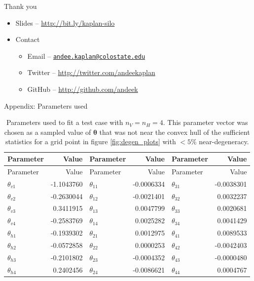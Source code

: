 \documentclass[ignorenonframetext,]{beamer}
\providecommand{\tightlist}{%
  \setlength{\itemsep}{0pt}\setlength{\parskip}{0pt}}
\theoremstyle{definition}
\newcommand{\nv}{{n_{\scriptscriptstyle V}}}
\newcommand{\nh}{{n_{\scriptscriptstyle H}}}
\begin{document}
\begin{frame}{Thank you}
\protect\hypertarget{thank-you}{}

\begin{itemize}
\item
  Slides -- \url{http://bit.ly/kaplan-silo}
\item
  Contact

  \begin{itemize}
  \tightlist
  \item
    Email --
    \href{mailto:andee.kaplan@colostate.edu}{\nolinkurl{andee.kaplan@colostate.edu}}
  \item
    Twitter -- \url{http://twitter.com/andeekaplan}
  \item
    GitHub -- \url{http://github.com/andeek}
  \end{itemize}
\end{itemize}

\end{frame}

\begin{frame}{Appendix: Parameters used}
\protect\hypertarget{appendix-parameters-used}{}

\scriptsize

\begin{longtable}[]{@{}lrlrlr@{}}
\caption{\label{tab:theta}Parameters used to fit a test case with
\(\nv = \nh = 4\). This parameter vector was chosen as a sampled value
of \(\boldsymbol \theta\) that was not near the convex hull of the
sufficient statistics for a grid point in figure \ref{fig:degen_plots}
with \(< 5\)\% near-degeneracy.}\tabularnewline
\toprule
Parameter & Value & Parameter & Value & Parameter & Value\tabularnewline
\midrule
\endfirsthead
\toprule
Parameter & Value & Parameter & Value & Parameter & Value\tabularnewline
\midrule
\endhead
\(\theta_{v1}\) & -1.1043760 & \(\theta_{11}\) & -0.0006334 &
\(\theta_{31}\) & -0.0038301\tabularnewline
\(\theta_{v2}\) & -0.2630044 & \(\theta_{12}\) & -0.0021401 &
\(\theta_{32}\) & 0.0032237\tabularnewline
\(\theta_{v3}\) & 0.3411915 & \(\theta_{13}\) & 0.0047799 &
\(\theta_{33}\) & 0.0020681\tabularnewline
\(\theta_{v4}\) & -0.2583769 & \(\theta_{14}\) & 0.0025282 &
\(\theta_{34}\) & 0.0041429\tabularnewline
\(\theta_{h1}\) & -0.1939302 & \(\theta_{21}\) & 0.0012975 &
\(\theta_{41}\) & 0.0089533\tabularnewline
\(\theta_{h2}\) & -0.0572858 & \(\theta_{22}\) & 0.0000253 &
\(\theta_{42}\) & -0.0042403\tabularnewline
\(\theta_{h3}\) & -0.2101802 & \(\theta_{23}\) & -0.0004352 &
\(\theta_{43}\) & -0.0000480\tabularnewline
\(\theta_{h4}\) & 0.2402456 & \(\theta_{24}\) & -0.0086621 &
\(\theta_{44}\) & 0.0004767\tabularnewline
\bottomrule
\end{longtable}

\end{frame}
\end{document}
